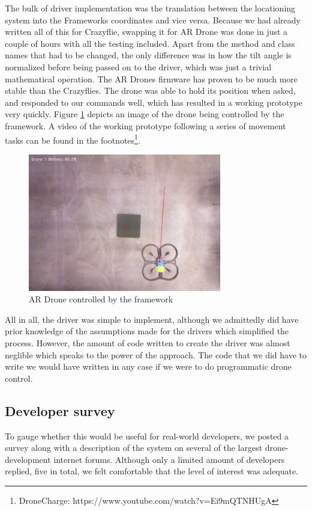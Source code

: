 The bulk of driver implementation was the translation between the locationing system into the Frameworks coordinates and vice versa. Because we had already written all of this for Crazyflie, swapping it for AR Drone was done in just a couple of hours with all the testing included. Apart from the method and class names that had to be changed, the only difference was in how the tilt angle is normalized before being passed on to the driver, which was just a trivial mathematical operation. The AR Drones firmware has proven to be much more stable than the Crazyflies. The drone was able to hold its position when asked, and responded to our commands well, which has resulted in a working prototype very quickly. Figure \ref{fig:ardrone} depicts an image of the drone being controlled by the framework. A video of the working prototype following a series of movement tasks can be found in the footnotes\footnote{DroneCharge: https://www.youtube.com/watch?v=Ei9mQTNHUgA}.

\begin{figure}[h]
\begin{center}
\includegraphics[height=6cm]{images/drone.png}
\caption{AR Drone controlled by the framework}
\label{fig:ardrone}
\end{center}
\end{figure}

All in all, the driver was simple to implement, although we admittedly did have prior knowledge of the assumptions made for the drivers which simplified the process. However, the amount of code written to create the driver was almost neglible which speaks to the power of the approach. The code that we did have to write we would have written in any case if we were to do programmatic drone control.

\subsection{Developer survey}
To gauge whether this would be useful for real-world developers, we posted a survey along with a description of the system on several of the largest drone-development internet forums. Although only a limited amount of developers replied, five in total, we felt comfortable that the level of interest was adequate. 

